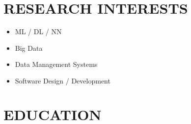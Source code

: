 \documentclass[10pt,a4paper,sans]{moderncv} %
\begin{document}
	
	\makecvtitle
	
	\section{RESEARCH INTERESTS}
	\begin{itemize}
		\item ML / DL / NN 
		\item Big Data
		\item Data Management Systems
		\item Software Design / Development
	\end{itemize}
	
	\section{EDUCATION}
	
\end{document}
